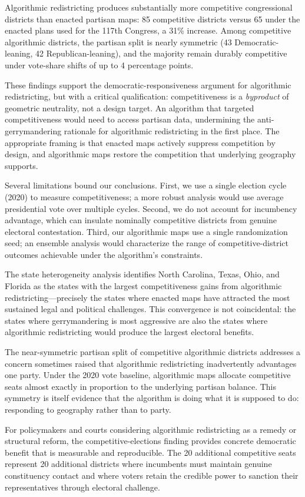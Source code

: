\label{sec:conclusion}

Algorithmic redistricting produces substantially more competitive
congressional districts than enacted partisan maps: 85 competitive districts
versus 65 under the enacted plans used for the 117th Congress, a 31\%
increase.  Among competitive algorithmic districts, the partisan split is
nearly symmetric (43 Democratic-leaning, 42 Republican-leaning), and the
majority remain durably competitive under vote-share shifts of up to 4
percentage points.

These findings support the democratic-responsiveness argument for algorithmic
redistricting, but with a critical qualification: competitiveness is a
\emph{byproduct} of geometric neutrality, not a design target.  An algorithm
that targeted competitiveness would need to access partisan data, undermining
the anti-gerrymandering rationale for algorithmic redistricting in the first
place.  The appropriate framing is that enacted maps actively suppress
competition by design, and algorithmic maps restore the competition that
underlying geography supports.

Several limitations bound our conclusions.  First, we use a single election
cycle (2020) to measure competitiveness; a more robust analysis would use
average presidential vote over multiple cycles.  Second, we do not account
for incumbency advantage, which can insulate nominally competitive districts
from genuine electoral contestation.  Third, our algorithmic maps use a
single randomization seed; an ensemble analysis \citep{dellaLibera2026uncertainty}
would characterize the range of competitive-district outcomes achievable under
the algorithm's constraints.

The state heterogeneity analysis identifies North Carolina, Texas, Ohio, and
Florida as the states with the largest competitiveness gains from algorithmic
redistricting---precisely the states where enacted maps have attracted the
most sustained legal and political challenges.  This convergence is not
coincidental: the states where gerrymandering is most aggressive are also the
states where algorithmic redistricting would produce the largest electoral
benefits.

The near-symmetric partisan split of competitive algorithmic districts
addresses a concern sometimes raised that algorithmic redistricting
inadvertently advantages one party.  Under the 2020 vote baseline, algorithmic
maps allocate competitive seats almost exactly in proportion to the underlying
partisan balance.  This symmetry is itself evidence that the algorithm is
doing what it is supposed to do: responding to geography rather than to party.

For policymakers and courts considering algorithmic redistricting as a remedy
or structural reform, the competitive-elections finding provides concrete
democratic benefit that is measurable and reproducible.  The 20 additional
competitive seats represent 20 additional districts where incumbents must
maintain genuine constituency contact and where voters retain the credible
power to sanction their representatives through electoral challenge.
